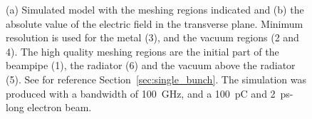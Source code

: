 \begin{figure}[!t]
\centering
{}
\hspace{8mm}
\caption{(a) Simulated model with the meshing regions indicated and (b) the absolute value of the electric field in the transverse plane. Minimum resolution is used for the metal (3), and the vacuum regions (2 and 4). The high quality meshing regions are the initial part of the beampipe (1), the radiator (6) and the vacuum above the radiator (5). See for reference Section~\ref{sec:single_bunch}. The simulation was produced with a bandwidth of 100~GHz, and a 100~pC and 2~ps-long electron beam.}
\label{fig:90deg_model}
\end{figure}





